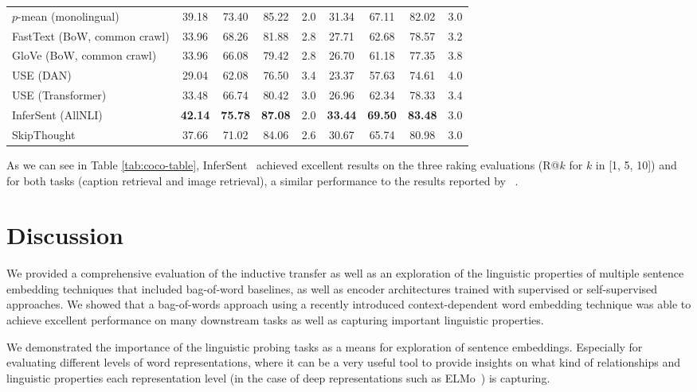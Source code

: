 \documentclass{article}
\begin{document}
\begin{table}[!htb]
{\begin{tabular}{l|cccc|cccc}
$p$-mean (monolingual)               & 39.18    & 73.40    & 85.22  & 2.0      & 31.34    & 67.11    & 82.02    & 3.0    \\
FastText (BoW, common crawl)             & 33.96    & 68.26    & 81.88  & 2.8      & 27.71    & 62.68    & 78.57    & 3.2    \\
GloVe (BoW, common crawl)                & 33.96    & 66.08    & 79.42  & 2.8      & 26.70    & 61.18    & 77.35    & 3.8    \\
USE (DAN)         & 29.04    & 62.08    & 76.50  & 3.4      & 23.37    & 57.63    & 74.61    & 4.0    \\
USE (Transformer)    & 33.48    & 66.74    & 80.42  & 3.0      & 26.96    & 62.34    & 78.33    & 3.4    \\
InferSent (AllNLI)            & \textbf{42.14}    & \textbf{75.78}    & \textbf{87.08}  & 2.0      & \textbf{33.44}    & \textbf{69.50}    & \textbf{83.48}    & 3.0    \\
SkipThought          & 37.66    & 71.02    & 84.06  & 2.6      & 30.67    & 65.74    & 80.98    & 3.0    \\
    \bottomrule
  \end{tabular}
  }
\end{table}

As we can see in Table \ref{tab:coco-table}, InferSent~\cite{conneau2017supervised} achieved excellent results on the three raking evaluations (R@$k$ for $k$ in [1, 5, 10]) and for both tasks (caption retrieval and image retrieval), a similar performance to the results reported by ~\cite{conneau2017supervised}.


\section{Discussion}
\label{sec:discussion}
We provided a comprehensive evaluation of the inductive transfer as well as an exploration of the linguistic properties of multiple sentence embedding techniques that included bag-of-word baselines, as well as encoder architectures trained with supervised or self-supervised approaches. We showed that a bag-of-words approach using a recently introduced context-dependent word embedding technique was able to achieve excellent performance on many downstream tasks as well as capturing important linguistic properties. 

We demonstrated the importance of the linguistic probing tasks as a means for exploration of sentence embeddings. Especially for evaluating different levels of word representations, where it can be a very useful tool to provide insights on what kind of relationships and linguistic properties each representation level (in the case of deep representations such as ELMo~\cite{peters2018deep}) is capturing.
\end{document}
